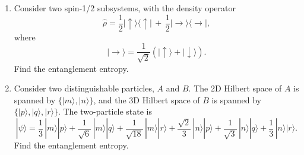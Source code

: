 \documentclass[prx,12pt]{revtex4-2}
\begin{document}
\begin{enumerate}
\begin{enumerate}[(a)]
\end{enumerate}


  

\item Consider two spin-1/2 subsystems, with the density operator
  \begin{equation}
    \hat{\rho} = \frac{1}{2} |\!\uparrow\rangle \langle\uparrow\!|
    \,+\, \frac{1}{2} |\!\rightarrow\rangle \langle\rightarrow\!|,
    \label{den}
  \end{equation}
  where
  \begin{equation}
    |\!\rightarrow\rangle = \frac{1}{\sqrt{2}} \left(|\!\uparrow\rangle +
  |\!\downarrow\rangle\right).
  \end{equation}
  Find the entanglement entropy.
  \label{ex:rho_decomp}

\item 
  Consider two distinguishable particles, $A$ and $B$.  The 2D Hilbert
  space of $A$ is spanned by $\{|m\rangle, |n\rangle\}$, and the
  3D Hilbert space of $B$ is spanned by $\{|p\rangle, |q\rangle,
  |r\rangle\}$.  The two-particle state is
\begin{equation}
  |\psi\rangle = \frac{1}{3} \, |m\rangle|p\rangle
+ \frac{1}{\sqrt{6}} \, |m\rangle|q\rangle
+ \frac{1}{\sqrt{18}} \, |m\rangle|r\rangle
+ \frac{\sqrt{2}}{3} \, |n\rangle|p\rangle
+ \frac{1}{\sqrt{3}} \, |n\rangle|q\rangle
+ \frac{1}{3} \, |n\rangle|r\rangle.
\end{equation}
Find the entanglement entropy.

\end{enumerate}
\end{document}
